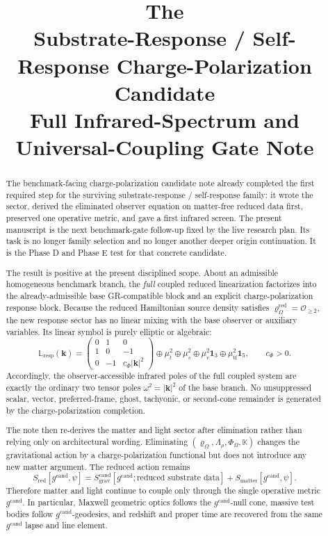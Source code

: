 \documentclass[11pt]{article}
\title{\textbf{The \TheoryName{}}\\[0.4em]
\large Substrate-Response / Self-Response Charge-Polarization Candidate\\
\large Full Infrared-Spectrum and Universal-Coupling Gate Note}
\author{}
\date{}
\newcommand{\CandidateMetric}{g^{\mathrm{cand}}}
\newcommand{\AuxPol}{\mathbb K}
\newcommand{\FlowPot}{\Phi_\Omega}
\newcommand{\SourceDensity}{\varrho_\Omega}
\newcommand{\SourceDensityRed}{\varrho_\Omega^{\mathrm{red}}}
\newcommand{\SourceMult}{\Lambda_\rho}
\newcommand{\RespLin}{\mathbb L_{\mathrm{resp}}}
\newcommand{\MatterAct}{S_{\mathrm{matter}}}
\newcommand{\RedAct}{S_{\mathrm{red}}}
\begin{document}
\maketitle

\begin{abstract}
The benchmark-facing charge-polarization candidate note already completed the first required step for the surviving substrate-response / self-response family: it wrote the sector, derived the eliminated observer equation on matter-free reduced data first, preserved one operative metric, and gave a first infrared screen. The present manuscript is the next benchmark-gate follow-up fixed by the live research plan. Its task is no longer family selection and no longer another deeper origin continuation. It is the Phase D and Phase E test for that concrete candidate.

The result is positive at the present disciplined scope. About an admissible homogeneous benchmark branch, the \emph{full} coupled reduced linearization factorizes into the already-admissible base GR-compatible block and an explicit charge-polarization response block. Because the reduced Hamiltonian source density satisfies \(\SourceDensityRed=\mathcal O_{\ge 2}\), the new response sector has no linear mixing with the base observer or auxiliary variables. Its linear symbol is purely elliptic or algebraic:
\[
\RespLin(\mathbf{k})
=
\begin{pmatrix}
0 & 1 & 0 \\
1 & 0 & -1 \\
0 & -1 & c_\Phi |\mathbf{k}|^2
\end{pmatrix}
\oplus \mu_t^2 \oplus \mu_s^2 \oplus \mu_v^2\mathbf 1_3 \oplus \mu_{\mathrm{tf}}^2\mathbf 1_5,
\qquad
c_\Phi>0.
\]
Accordingly, the observer-accessible infrared poles of the full coupled system are exactly the ordinary two tensor poles \(\omega^2=|\mathbf{k}|^2\) of the base branch. No unsuppressed scalar, vector, preferred-frame, ghost, tachyonic, or second-cone remainder is generated by the charge-polarization completion.

The note then re-derives the matter and light sector after elimination rather than relying only on architectural wording. Eliminating \((\SourceDensity,\SourceMult,\FlowPot,\AuxPol)\) changes the gravitational action by a charge-polarization functional but does not introduce any new matter argument. The reduced action remains
\[
\RedAct[\CandidateMetric,\psi]
=
S_{\mathrm{grav}}^{\mathrm{cand}}[\CandidateMetric;\text{reduced substrate data}]
+
\MatterAct[\CandidateMetric,\psi].
\]
Therefore matter and light continue to couple only through the single operative metric \(\CandidateMetric\). In particular, Maxwell geometric optics follows the \(\CandidateMetric\)-null cone, massive test bodies follow \(\CandidateMetric\)-geodesics, and redshift and proper time are recovered from the same \(\CandidateMetric\) lapse and line element.


\end{abstract}
\end{document}
